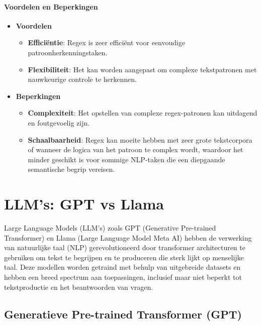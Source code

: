 \paragraph{Voordelen en Beperkingen}
\begin{itemize}
    \item \textbf{Voordelen}
    \begin{itemize}
        \item \textbf{Efficiëntie}: Regex is zeer efficiënt voor eenvoudige patroonherkenningstaken.
        \item \textbf{Flexibiliteit}: Het kan worden aangepast om complexe tekstpatronen met nauwkeurige controle te herkennen.
    \end{itemize}
    \item \textbf{Beperkingen}
    \begin{itemize}
        \item \textbf{Complexiteit}: Het opstellen van complexe regex-patronen kan uitdagend en foutgevoelig zijn.
        \item \textbf{Schaalbaarheid}: Regex kan moeite hebben met zeer grote tekstcorpora of wanneer de logica van het patroon te complex wordt, waardoor het minder geschikt is voor sommige NLP-taken die een diepgaande semantische begrip vereisen.
    \end{itemize}
\end{itemize}



\section{LLM's: GPT vs Llama}

Large Language Models (LLM's) zoals GPT (Generative Pre-trained Transformer) en Llama (Large Language Model Meta AI) hebben de verwerking van natuurlijke taal (NLP) gerevolutioneerd  door  transformer architecturen te gebruiken om tekst te begrijpen en te produceren die sterk lijkt op menselijke taal. Deze modellen worden getraind met behulp van uitgebreide datasets en hebben een breed spectrum aan toepassingen, inclusief maar niet beperkt tot tekstproductie en het beantwoorden van vragen.



\subsection{Generatieve Pre-trained Transformer (GPT)}

